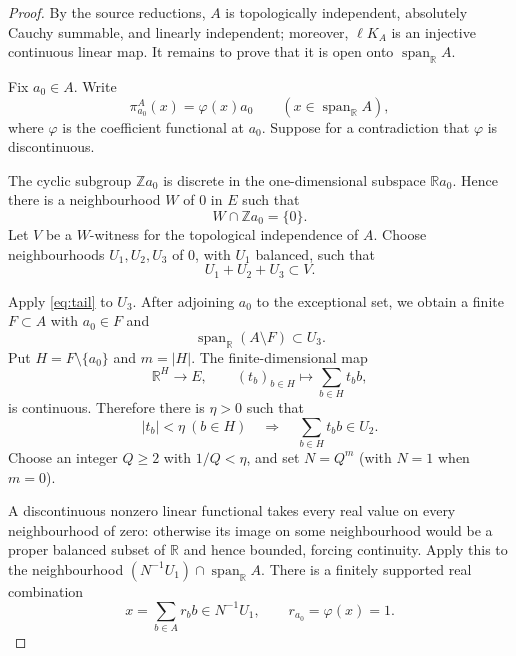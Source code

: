 \documentclass[11pt]{article}
\newcommand{\R}{\mathbb{R}}
\newcommand{\Z}{\mathbb{Z}}
\newcommand{\spanR}{\operatorname{span}_{\R}}
\newcommand{\lKA}{\ell K_A}
\begin{document}
\begin{proof}
By the source reductions, $A$ is topologically independent, absolutely
Cauchy summable, and linearly independent; moreover, $\lKA$ is an injective
continuous linear map. It remains to prove that it is open onto $\spanR A$.

Fix $a_0\in A$. Write
\[
   \pi^A_{a_0}(x)=\varphi(x)a_0\qquad(x\in\spanR A),
\]
where $\varphi$ is the coefficient functional at $a_0$. Suppose for a
contradiction that $\varphi$ is discontinuous.

The cyclic subgroup $\Z a_0$ is discrete in the one-dimensional subspace
$\R a_0$. Hence there is a neighbourhood $W$ of $0$ in $E$ such that
\begin{equation}\label{eq:cyclic}
   W\cap\Z a_0=\{0\}.
\end{equation}
Let $V$ be a $W$-witness for the topological independence of $A$. Choose
neighbourhoods $U_1,U_2,U_3$ of $0$, with $U_1$ balanced, such that
\begin{equation}\label{eq:sum}
   U_1+U_2+U_3\subset V.
\end{equation}

Apply \eqref{eq:tail} to $U_3$. After adjoining $a_0$ to the exceptional
set, we obtain a finite $F\subset A$ with $a_0\in F$ and
\begin{equation}\label{eq:tailsmall}
   \spanR(A\setminus F)\subset U_3.
\end{equation}
Put $H=F\setminus\{a_0\}$ and $m=|H|$. The finite-dimensional map
\[
   \R^H\longrightarrow E,\qquad (t_b)_{b\in H}\longmapsto
   \sum_{b\in H}t_b b,
\]
is continuous. Therefore there is $\eta>0$ such that
\begin{equation}\label{eq:headsmall}
   |t_b|<\eta\ (b\in H)
   \quad\Longrightarrow\quad
   \sum_{b\in H}t_b b\in U_2.
\end{equation}
Choose an integer $Q\ge2$ with $1/Q<\eta$, and set $N=Q^m$ (with
$N=1$ when $m=0$).

A discontinuous nonzero linear functional takes every real value on every
neighbourhood of zero: otherwise its image on some neighbourhood would be a
proper balanced subset of $\R$ and hence bounded, forcing continuity. Apply
this to the neighbourhood $(N^{-1}U_1)\cap\spanR A$. There is a finitely
supported real combination
\begin{equation}\label{eq:x}
   x=\sum_{b\in A}r_b b\in N^{-1}U_1,
   \qquad r_{a_0}=\varphi(x)=1.
\end{equation}


\end{proof}
\end{document}
